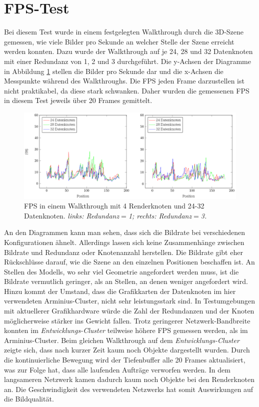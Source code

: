 \section{FPS-Test}
\label{sec:eval:fps}
Bei diesem Test wurde in einem festgelegten Walkthrough durch die 3D-Szene gemessen, wie viele Bilder pro Sekunde an welcher Stelle der Szene erreicht werden konnten. Dazu wurde der Walkthrough auf je 24, 28 und 32 Datenknoten mit einer Redundanz von 1, 2 und 3 durchgeführt. Die y-Achsen der Diagramme in Abbildung \ref{fig:eval:fps} stellen die Bilder pro Sekunde dar und die x-Achsen die Messpunkte während des Walkthroughs. Die FPS jeden Frame darzustellen ist nicht praktikabel, da diese stark schwanken. Daher wurden die gemessenen FPS in diesem Test jeweils über 20 Frames gemittelt.
\begin{figure}
\centering
\includegraphics[scale=0.75]{images/diag_fps.pdf}
  \caption{\label{fig:eval:fps}FPS in einem Walkthrough mit 4 Renderknoten und 24-32 Datenknoten. \textit{links: Redundanz$=$1; rechts: Redundanz$=$3.}}
\end{figure}

An den Diagrammen kann man sehen, dass sich die Bildrate bei verschiedenen Konfigurationen ähnelt. Allerdings lassen sich keine Zusammenhänge zwischen Bildrate und Redundanz oder Knotenanzahl herstellen. Die Bildrate gibt eher Rückschlüsse darauf, wie die Szene an den einzelnen Positionen beschaffen ist. An Stellen des Modells, wo sehr viel Geometrie angefordert werden muss, ist die Bildrate vermutlich geringer, als an Stellen, an denen weniger angefordert wird. Hinzu kommt der Umstand, dass die Grafikkarten der Datenknoten im hier verwendeten Arminius-Cluster, nicht sehr leistungsstark sind. In Testumgebungen mit aktuellerer Grafikhardware würde die Zahl der Redundanzen und der Knoten möglicherweise stärker ins Gewicht fallen. Trotz geringerer Netzwerk-Bandbreite konnten im \textit{Entwicklungs-Cluster} teilweise höhere FPS gemessen werden, als im Arminius-Cluster. Beim gleichen Walkthrough auf dem \textit{Entwicklungs-Cluster} zeigte sich, dass nach kurzer Zeit kaum noch Objekte dargestellt wurden. Durch die kontinuierliche Bewegung wird der Tiefenbuffer alle 20 Frames aktualisiert, was zur Folge hat, dass alle laufenden Aufträge verworfen werden. In dem langsameren Netzwerk kamen dadurch kaum noch Objekte bei den Renderknoten an. Die Geschwindigkeit des verwendeten Netzwerks hat somit Auswirkungen auf die Bildqualität.


